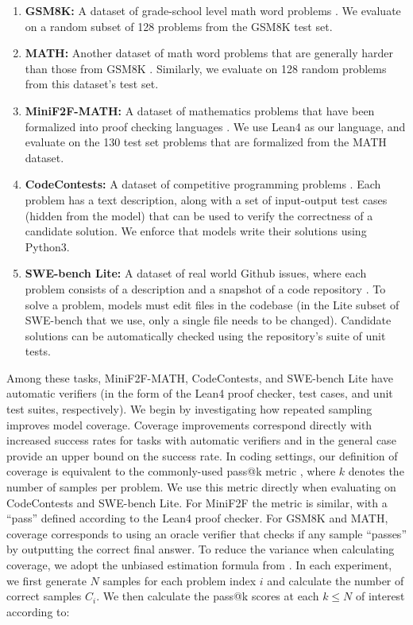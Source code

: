 \documentclass[11pt]{article}
\begin{document}
\begin{enumerate}
    \item \textbf{GSM8K:} A dataset of grade-school level math word problems \cite{cobbe2021training}. We evaluate on a random subset of 128 problems from the GSM8K test set.
    \item \textbf{MATH:}  Another dataset of math word problems that are generally harder than those from GSM8K \cite{chen2024alphamath}. Similarly, we evaluate on 128 random problems from this dataset's test set.
    \item \textbf{MiniF2F-MATH:} A dataset of mathematics problems that have been formalized into proof checking languages \cite{zheng2021minif2f}. We use Lean4 as our language, and evaluate on the 130 test set problems that are formalized from the MATH dataset. 
    
    \item \textbf{CodeContests:} A dataset of competitive programming problems \cite{Li_2022}. Each problem has a text description, along with a set of input-output test cases (hidden from the model) that can be used to verify the correctness of a candidate solution. We enforce that models write their solutions using Python3. 
    \item \textbf{SWE-bench Lite:} A dataset of real world Github issues, where each problem consists of a description and a snapshot of a code repository \cite{jimenez2024swebenchlanguagemodelsresolve}. To solve a problem, models must edit files in the codebase (in the Lite subset of SWE-bench that we use, only a single file needs to be changed). Candidate solutions can be automatically checked using the repository’s suite of unit tests.
\end{enumerate} 

Among these tasks, MiniF2F-MATH, CodeContests, and SWE-bench Lite have automatic verifiers (in the form of the Lean4 proof checker, test cases, and unit test suites, respectively).
We begin by investigating how repeated sampling improves model coverage. Coverage improvements correspond directly with increased success rates for tasks with automatic verifiers and in the general case provide an upper bound on the success rate. 
In coding settings, our definition of coverage is equivalent to the commonly-used pass@k metric \cite{chen2021evaluatinglargelanguagemodels}, where $k$ denotes the number of samples per problem. We use this metric directly when evaluating on CodeContests and SWE-bench Lite. For MiniF2F the metric is similar, with a ``pass'' defined according to the Lean4 proof checker. For GSM8K and MATH, coverage corresponds to using an oracle verifier that checks if any sample ``passes'' by outputting the correct final answer. To reduce the variance when calculating coverage, we adopt the unbiased estimation formula from \citet{chen2021evaluatinglargelanguagemodels}. In each experiment, we first generate $N$ samples for each problem index $i$ and calculate the number of correct samples $C_i$. We then calculate the pass@k scores at each $k \le N$ of interest according to:
\end{document}
